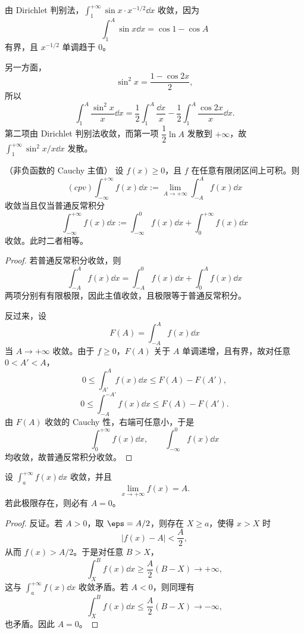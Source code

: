 \begin{solution}
	由 Dirichlet 判别法，$\displaystyle\int_1^{+\infty}\sin x\cdot x^{-1/2}\dd x$ 收敛，因为
	\[
	\int_1^A\sin x\dd x=\cos1-\cos A
	\]
	有界，且 $x^{-1/2}$ 单调趋于 $0$。
	
	另一方面，
	\[
	\sin^2x=\frac{1-\cos2x}{2},
	\]
	所以
	\[
	\int_1^A\frac{\sin^2x}{x}\dd x
	=\frac12\int_1^A\frac{\dd x}{x}
	-\frac12\int_1^A\frac{\cos2x}{x}\dd x.
	\]
	第二项由 Dirichlet 判别法收敛，而第一项 $\dfrac12\ln A$ 发散到 $+\infty$，故 $\displaystyle\int_1^{+\infty}\sin^2x/x\dd x$ 发散。
\end{solution}

\begin{proposition}（非负函数的 Cauchy 主值）
	设 $f(x)\geq0$，且 $f$ 在任意有限闭区间上可积。则
	\[
	(cpv)\int_{-\infty}^{+\infty}f(x)\dd x
	:=\lim_{A\to+\infty}\int_{-A}^{A}f(x)\dd x
	\]
	收敛当且仅当普通反常积分
	\[
	\int_{-\infty}^{+\infty}f(x)\dd x
	:=\int_{-\infty}^{0}f(x)\dd x+\int_0^{+\infty}f(x)\dd x
	\]
	收敛。此时二者相等。
\end{proposition}

\begin{proof}
	若普通反常积分收敛，则
	\[
	\int_{-A}^{A}f(x)\dd x
	=\int_{-A}^{0}f(x)\dd x+\int_0^{A}f(x)\dd x
	\]
	两项分别有有限极限，因此主值收敛，且极限等于普通反常积分。
	
	反过来，设
	\[
	F(A)=\int_{-A}^{A}f(x)\dd x
	\]
	当 $A\to+\infty$ 收敛。由于 $f\geq0$，$F(A)$ 关于 $A$ 单调递增，且有界，故对任意 $0<A'<A$，
	\[
	0\leq \int_{A'}^{A}f(x)\dd x\leq F(A)-F(A'),
	\]
	\[
	0\leq \int_{-A}^{-A'}f(x)\dd x\leq F(A)-F(A').
	\]
	由 $F(A)$ 收敛的 Cauchy 性，右端可任意小，于是
	\[
	\int_0^{+\infty}f(x)\dd x,
	\qquad
	\int_{-\infty}^{0}f(x)\dd x
	\]
	均收敛，故普通反常积分收敛。
\end{proof}

\begin{proposition}
	设 $\displaystyle\int_a^{+\infty}f(x)\dd x$ 收敛，并且
	\[
	\lim_{x\to+\infty}f(x)=A.
	\]
	若此极限存在，则必有 $A=0$。
\end{proposition}

\begin{proof}
	反证。若 $A>0$，取 $\eps=A/2$，则存在 $X\geq a$，使得 $x>X$ 时
	\[
	|f(x)-A|<\frac A2,
	\]
	从而 $f(x)>A/2$。于是对任意 $B>X$，
	\[
	\int_X^B f(x)\dd x\geq \frac A2(B-X)\to+\infty,
	\]
	这与 $\displaystyle\int_a^{+\infty}f(x)\dd x$ 收敛矛盾。若 $A<0$，则同理有
	\[
	\int_X^B f(x)\dd x\leq \frac A2(B-X)\to-\infty,
	\]
	也矛盾。因此 $A=0$。
\end{proof}


